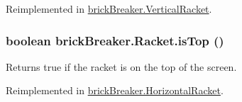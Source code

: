 Reimplemented in \hyperlink{classbrick_breaker_1_1_vertical_racket_ad8c73b81712009be68fa497c48b71012}{brickBreaker.VerticalRacket}.

\hypertarget{classbrick_breaker_1_1_racket_a0bd80cbd11ffe9afd6212e2d96a88554}{
\subsubsection[{isTop}]{\setlength{\rightskip}{0pt plus 5cm}boolean brickBreaker.Racket.isTop ()}}
\label{classbrick_breaker_1_1_racket_a0bd80cbd11ffe9afd6212e2d96a88554}
Returns true if the racket is on the top of the screen. 

Reimplemented in \hyperlink{classbrick_breaker_1_1_horizontal_racket_a12688619999a3e4d302449ab4bcd0e3d}{brickBreaker.HorizontalRacket}.

